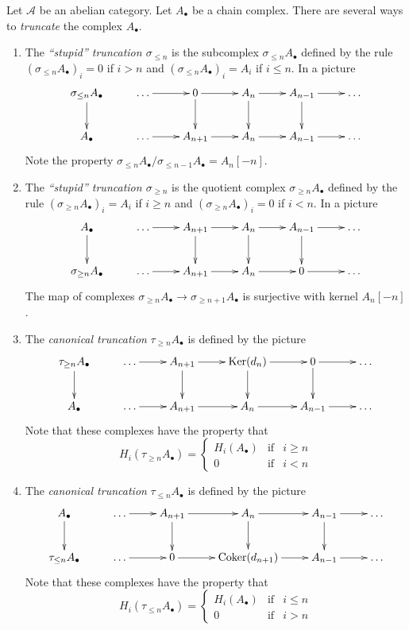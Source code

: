 \noindent
Let $\mathcal{A}$ be an abelian category.
Let $A_\bullet$ be a chain complex. There
are several ways to {\it truncate} the complex $A_\bullet$.
\begin{enumerate}
\item The {\it ``stupid'' truncation $\sigma_{\leq n}$}
is the subcomplex $\sigma_{\leq n} A_\bullet$ defined
by the rule $(\sigma_{\leq n} A_\bullet)_i = 0$ if
$i > n$ and $(\sigma_{\leq n} A_\bullet)_i = A_i$ if
$i \leq n$. In a picture
$$
\xymatrix{
\sigma_{\leq n}A_\bullet \ar[d]  &
\ldots \ar[r] &
0 \ar[r] \ar[d] &
A_n \ar[r] \ar[d] &
A_{n - 1} \ar[r] \ar[d] &
\ldots \\
A_\bullet  &
\ldots \ar[r] &
A_{n + 1} \ar[r] &
A_n \ar[r] &
A_{n - 1} \ar[r] &
\ldots
}
$$
Note the property
$\sigma_{\leq n}A_\bullet / \sigma_{\leq n - 1}A_\bullet = A_n[-n]$.
\item The {\it ``stupid'' truncation $\sigma_{\geq n}$}
is the quotient complex $\sigma_{\geq n} A_\bullet$ defined
by the rule $(\sigma_{\geq n} A_\bullet)_i = A_i$ if
$i \geq n$ and $(\sigma_{\geq n} A_\bullet)_i = 0$ if
$i < n$. In a picture
$$
\xymatrix{
A_\bullet \ar[d]  &
\ldots \ar[r] &
A_{n + 1} \ar[r] \ar[d] &
A_n \ar[r] \ar[d] &
A_{n - 1} \ar[r] \ar[d] &
\ldots \\
\sigma_{\geq n}A_\bullet  &
\ldots \ar[r] &
A_{n + 1} \ar[r] &
A_n \ar[r] &
0 \ar[r] &
\ldots
}
$$
The map of complexes
$\sigma_{\geq n}A_\bullet \to \sigma_{\geq n + 1}A_\bullet$ is surjective
with kernel $A_n[-n]$.
\item The {\it canonical truncation} $\tau_{\geq n}A_\bullet$
is defined by the picture
$$
\xymatrix{
\tau_{\geq n}A_\bullet \ar[d]  &
\ldots \ar[r] &
A_{n + 1} \ar[r] \ar[d] &
\Ker(d_n) \ar[r] \ar[d] &
0 \ar[r] \ar[d] &
\ldots \\
A_\bullet  &
\ldots \ar[r] &
A_{n + 1} \ar[r] &
A_n \ar[r] &
A_{n - 1} \ar[r] &
\ldots
}
$$
Note that these complexes have the property that
$$
H_i(\tau_{\geq n}A_\bullet) =
\left\{
\begin{matrix}
H_i(A_\bullet) & \text{if} & i \geq n \\
0 & \text{if} & i < n
\end{matrix}
\right.
$$
\item The {\it canonical truncation} $\tau_{\leq n}A_\bullet$
is defined by the picture
$$
\xymatrix{
A_\bullet \ar[d]  &
\ldots \ar[r] &
A_{n + 1} \ar[r] \ar[d] &
A_n \ar[r] \ar[d] &
A_{n - 1} \ar[r] \ar[d] &
\ldots \\
\tau_{\leq n}A_\bullet  &
\ldots \ar[r] &
0 \ar[r] &
\Coker(d_{n + 1}) \ar[r] &
A_{n - 1} \ar[r] &
\ldots
}
$$
Note that these complexes have the property that
$$
H_i(\tau_{\leq n}A_\bullet) =
\left\{
\begin{matrix}
H_i(A_\bullet) & \text{if} & i \leq n \\
0 & \text{if} & i > n
\end{matrix}
\right.
$$
\end{enumerate}

